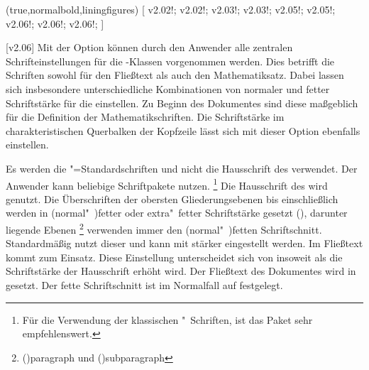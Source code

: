 \begin{DeclareEntity*}{}
\begin{DeclareEntity*}{}
\begin{DeclareEntity*}{}
\begin{Declaration}
  {}
  (true,normalbold,liningfigures)
[%
  v2.02!;
  v2.02!;
  v2.03!;
  v2.03!;
  v2.05!;
  v2.05!;
  v2.06!;
  v2.06!;
  v2.06!;
]
\printdeclarationlist

[v2.06]%
Mit der Option  können durch den Anwender alle zentralen 
Schrifteinstellungen für die \TUDScript-Klassen vorgenommen werden. Dies 
betrifft die Schriften sowohl für den Fließtext als auch den Mathematiksatz.
Dabei lassen sich insbesondere unterschiedliche Kombinationen von normaler und 
fetter Schriftstärke für die \OpenSans einstellen. Zu Beginn des Dokumentes 
sind diese maßgeblich für die Definition der Mathematikschriften. Die 
Schriftstärke im charakteristischen Querbalken der Kopfzeile lässt sich mit 
dieser Option ebenfalls einstellen.
%
\begin{DeclareValues}{}
  Es werden die "=Standardschriften und nicht die Hausschrift 
  des \CDs verwendet. Der Anwender kann beliebige Schriftpakete nutzen.%
  \footnote{%
    Für die Verwendung der klassischen "~Schriften, ist das 
    Paket  sehr empfehlenswert.%
  }
  Die Hausschrift \OpenSans des \CDs wird genutzt. Die Überschriften 
  der obersten Gliederungsebenen bis einschließlich  
  werden in (normal"~)fetter oder extra"~fetter Schriftstärke gesetzt
  (), darunter liegende Ebenen%
  \footnote{%
    \Macro(){paragraph} und 
    \Macro(){subparagraph}%
  }
  verwenden immer den (normal"~)fetten Schriftschnitt. Standardmäßig nutzt 
  dieser  und kann mit  
  stärker eingestellt werden. Im Fließtext kommt  zum 
  Einsatz.
  Diese Einstellung unterscheidet sich von  insoweit als 
  die Schriftstärke der Hausschrift erhöht wird. Der Fließtext des Dokumentes 
  wird in  gesetzt. Der fette Schriftschnitt ist im 
  Normalfall auf  festgelegt.
\end{DeclareValues}


\end{Declaration}
\end{DeclareEntity*}
\end{DeclareEntity*}
\end{DeclareEntity*}

